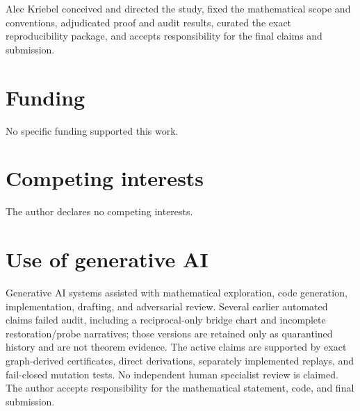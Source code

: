 \documentclass[11pt]{article}
\theoremstyle{remark}
\newcommand{\1}{\mathbf 1}
\begin{document}
Alec Kriebel conceived and directed the study, fixed the mathematical scope
and conventions, adjudicated proof and audit results, curated the exact
reproducibility package, and accepts responsibility for the final claims and
submission.

\section*{Funding}

No specific funding supported this work.

\section*{Competing interests}

The author declares no competing interests.

\section*{Use of generative AI}

Generative AI systems assisted with mathematical exploration, code generation,
implementation, drafting, and adversarial review.  Several earlier automated
claims failed audit, including a reciprocal-only bridge chart and incomplete
restoration/probe narratives; those versions are retained only as quarantined
history and are not theorem evidence.  The active claims are supported by
exact graph-derived certificates, direct derivations, separately implemented
replays, and fail-closed mutation tests.  No independent human specialist
review is claimed.  The author accepts responsibility for the mathematical
statement, code, and final submission.

{\small


}
\end{document}
